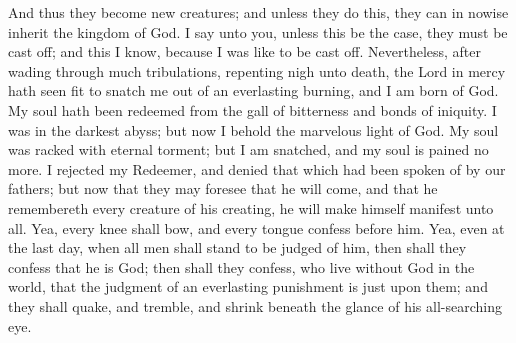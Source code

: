 And thus they become new creatures; and unless they do this, they can in nowise inherit the kingdom of God.
\bverse \iffalse I say unto you, unless this be the case, they must be cast off; and this I know, because I was like to be cast off. \fi
I say unto you, unless this be the case, they must be cast off; and this I know, because I was like to be cast off.
\bverse \iffalse Nevertheless, after wading through much tribulations, repenting nigh unto death, the Lord in mercy hath seen fit to snatch me out of an everlasting burning, and I am born of God. \fi
Nevertheless, after wading through much tribulations, repenting nigh unto death, the Lord in mercy hath seen fit to snatch me out of an everlasting burning, and I am born of God.
\bverse \iffalse My soul hath been redeemed from the gall of bitterness and bonds of iniquity. I was in the darkest abyss; but now I behold the marvelous light of God. My soul was racked with eternal torment; but I am snatched, and my soul is pained no more. \fi
My soul hath been redeemed from the gall of bitterness and bonds of iniquity. I was in the darkest abyss; but now I behold the marvelous light of God. My soul was racked with eternal torment; but I am snatched, and my soul is pained no more.
\bverse \iffalse I rejected my Redeemer, and denied that which had been spoken of by our fathers; but now that they may foresee that he will come, and that he remembereth every creature of his creating, he will make himself manifest unto all. \fi
I rejected my Redeemer, and denied that which had been spoken of by our fathers; but now that they may foresee that he will come, and that he remembereth every creature of his creating, he will make himself manifest unto all.
\bverse \iffalse Yea, every knee shall bow, and every tongue confess before him. Yea, even at the last day, when all men shall stand to be judged of him, then shall they confess that he is God; then shall they confess, who live without God in the world, that the judgment of an everlasting punishment is just upon them; and they shall quake, and tremble, and shrink beneath the glance of his all-searching eye. \fi
Yea, every knee shall bow, and every tongue confess before him. Yea, even at the last day, when all men shall stand to be judged of him, then shall they confess that he is God; then shall they confess, who live without God in the world, that the judgment of an everlasting punishment is just upon them; and they shall quake, and tremble, and shrink beneath the glance of his all-searching eye.
